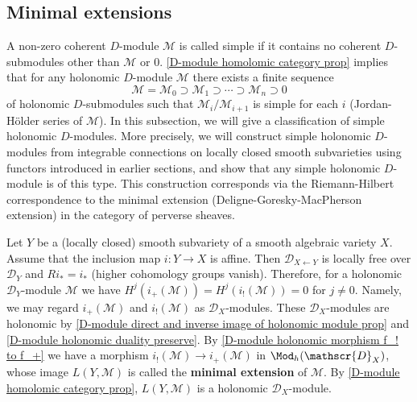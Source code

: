 \subsection{Minimal extensions}
A non-zero coherent $D$-module $\mathscr{M}$ is called simple if it contains no coherent $D$-submodules other than $\mathscr{M}$ or $0$. \cref{D-module homolomic category prop} implies that for any holonomic $D$-module $\mathscr{M}$ there exists a finite sequence
\[\mathscr{M}=\mathscr{M}_0\supset\mathscr{M}_1\supset\cdots\supset \mathscr{M}_n\supset 0\]
of holonomic $D$-submodules such that $\mathscr{M}_i/\mathscr{M}_{i+1}$ is simple for each $i$ (Jordan-H\"older series of $\mathscr{M}$). In this subsection, we will give a classification of simple holonomic $D$-modules. More precisely, we will construct simple holonomic $D$-modules from integrable connections on locally closed smooth subvarieties using functors introduced in earlier sections, and show that any simple holonomic $D$-module is of this type. This construction corresponds via the Riemann-Hilbert correspondence to the minimal extension (Deligne-Goresky-MacPherson extension) in the category of perverse sheaves.\par
Let $Y$ be a (locally closed) smooth subvariety of a smooth algebraic variety $X$. Assume that the inclusion map $i:Y\to X$ is affine. Then $\mathscr{D}_{X\leftarrow Y}$ is locally free over $\mathscr{D}_Y$ and $Ri_*=i_*$ (higher cohomology groups vanish). Therefore, for a holonomic $\mathscr{D}_Y$-module $\mathscr{M}$ we have $H^j(i_+(\mathscr{M}))=H^j(i_!(\mathscr{M}))=0$ for $j\neq 0$. Namely, we may regard $i_+(\mathscr{M})$ and $i_!(\mathscr{M})$ as $\mathscr{D}_X$-modules. These $\mathscr{D}_X$-modules are holonomic by \cref{D-module direct and inverse image of holonomic module prop} and \cref{D-module holonomic duality preserve}. By \cref{D-module holonomic morphism f_! to f_+} we have a morphism $i_!(\mathscr{M})\to i_+(\mathscr{M})$ in $\Mod_h(\mathscr{D}_X)$, whose image $L(Y,\mathscr{M})$ is called the \textbf{minimal extension} of $\mathscr{M}$. By \cref{D-module homolomic category prop}, $L(Y,\mathscr{M})$ is a holonomic $\mathscr{D}_X$-module.

